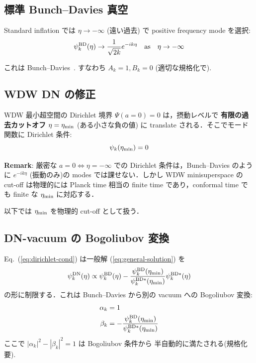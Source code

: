 \documentclass[11pt,a4paper]{article}
\begin{document}
\subsection{標準 Bunch--Davies 真空}

Standard inflation では $\eta \to -\infty$ (遠い過去) で positive
frequency mode を選択:
\begin{equation}
\psi_k^{\rm BD}(\eta) \to \frac{1}{\sqrt{2k}}e^{-ik\eta}
\quad \text{as}\quad \eta\to -\infty
\end{equation}

これは Bunch--Davies~\cite{BD1978}. すなわち $A_k = 1, B_k = 0$ (適切な規格化で).

\subsection{WDW DN の修正}

WDW 最小超空間の Dirichlet 境界 $\Psi(a=0) = 0$ は，摂動レベルで
\textbf{有限の過去カットオフ} $\eta = \eta_{\rm min}$ (ある小さな負の値)
に translate される．そこでモード関数に Dirichlet 条件:
\begin{equation}\label{eq:dirichlet-cond}
\psi_k(\eta_{\rm min}) = 0
\end{equation}

\textbf{Remark}: 厳密な $a=0 \Leftrightarrow \eta=-\infty$ での
Dirichlet 条件は，Bunch--Davies のように $e^{-ik\eta}$ (振動のみ)の
modes では課せない．しかし WDW minisuperspace の cut-off は物理的には
Planck time 相当の finite time であり，conformal time でも finite な
$\eta_{\rm min}$ に対応する．

以下では $\eta_{\rm min}$ を物理的 cut-off として扱う．

\subsection{DN-vacuum の Bogoliubov 変換}

Eq.~(\ref{eq:dirichlet-cond}) は一般解 (\ref{eq:general-solution}) を
\begin{equation}
\psi_k^{\rm DN}(\eta) \propto \psi_k^{\rm BD}(\eta)
- \frac{\psi_k^{\rm BD}(\eta_{\rm min})}{\psi_k^{\rm BD*}(\eta_{\rm min})}
\psi_k^{\rm BD*}(\eta)
\end{equation}
の形に制限する．これは Bunch--Davies から別の vacuum への Bogoliubov
変換:
\begin{align}
\alpha_k &= 1 \\
\beta_k &= -\frac{\psi_k^{\rm BD}(\eta_{\rm min})}{\psi_k^{\rm BD*}(\eta_{\rm min})}
\end{align}
ここで $|\alpha_k|^2 - |\beta_k|^2 = 1$ は Bogoliubov 条件から
半自動的に満たされる(規格化要).
\end{document}
